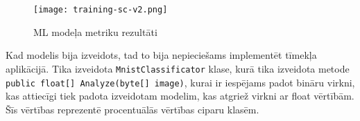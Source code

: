     \begin{figure}[H]
        \centering
        \texttt{[image: training-sc-v2.png]}
        \caption{ML modeļa metriku rezultāti}
        \label{ml:metrics}
    \end{figure}

    Kad modelis bija izveidots, tad to bija nepieciešams implementēt tīmekļa aplikācijā. Tika izveidota
    \texttt{MnistClassificator} klase, kurā tika izveidota metode
    \texttt{public float[] Analyze(byte[] image)}, kurai ir iespējams padot bināru virkni,
    kas attiecīgi tiek padota izveidotam modelim, kas atgriež virkni ar float vērtībām. Šīs vērtības
    reprezentē procentuālās vērtības ciparu klasēm.
